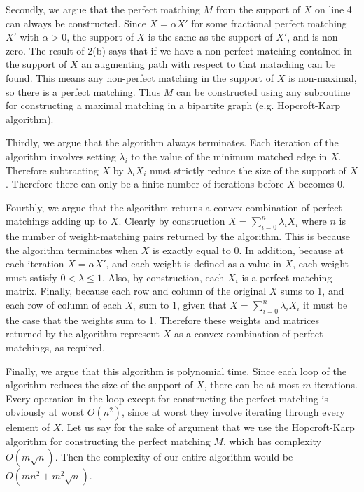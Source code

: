 \documentclass{hmcpset}
\begin{document}
\begin{solution}
\begin{enumerate}
Secondly, we argue that the perfect matching $M$ from the support of $X$
on line 4 can always be constructed. Since $X = \alpha X'$
for some fractional perfect matching $X'$ with $\alpha > 0$, the support
of $X$ is the same as the support of $X'$, and is non-zero.
The result of 2(b) says that if we have a non-perfect
matching contained in the support of $X$ an augmenting path with respect to
that mataching can be found. This means any non-perfect matching in the support
of $X$ is non-maximal, so there is a perfect matching. Thus $M$ can be constructed
using any subroutine for constructing a maximal matching in a bipartite graph
(e.g. Hopcroft-Karp algorithm).

Thirdly, we argue that the algorithm always terminates. Each iteration of the
algorithm involves setting $\lambda_i$ to the value of the minimum matched
edge in $X$. Therefore subtracting $X$ by $\lambda_i X_i$ must strictly reduce
the size of the support of $X$. Therefore there can only be a finite number
of iterations before $X$ becomes 0.

Fourthly, we argue that the algorithm returns a convex combination of perfect
matchings adding up to $X$. Clearly by construction $X = \sum_{i = 0}^n{\lambda_i X_i}$
where $n$ is the number of weight-matching pairs returned by the algorithm.
This is because the algorithm terminates when $X$ is exactly equal to 0.
In addition, because at each iteration $X = \alpha X'$, and each weight is
defined as a value in $X$, each weight must satisfy $0 < \lambda \leq 1$.
Also, by construction, each $X_i$ is a perfect matching matrix.
Finally, because each row and column of the original $X$ sums to 1,
and each row of column of each $X_i$ sum to 1, given that
$X = \sum_{i = 0}^n{\lambda_i X_i}$ it must be the case that the weights
sum to 1. Therefore these weights and matrices returned by the algorithm
represent $X$ as a convex combination of perfect matchings, as required.

Finally, we argue that this algorithm is polynomial time. Since each loop
of the algorithm reduces the size of the support of $X$, there can be at
most $m$ iterations. Every operation in the loop except for constructing
the perfect matching is obviously at worst $O(n^2)$, since at worst they
involve iterating through every element of $X$. Let us say for the sake of
argument that we use the Hopcroft-Karp algorithm for constructing the
perfect matching $M$, which has complexity $O(m\sqrt{n})$. Then the
complexity of our entire algorithm would be $O(mn^2 + m^2\sqrt{n})$.

\end{enumerate}
\end{solution}
\end{document}

